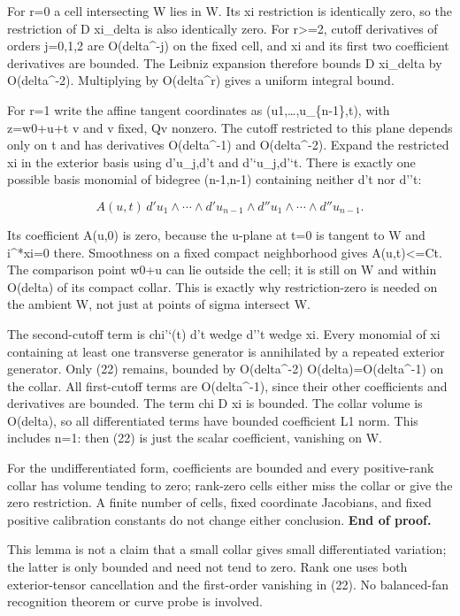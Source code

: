 \documentclass[
  10pt,
]{article}
\begin{document}
For r=0 a cell intersecting W lies in W. Its xi restriction is
identically zero, so the restriction of D xi\_delta is also identically
zero. For r\textgreater=2, cutoff derivatives of orders j=0,1,2 are
O(delta\^{}-j) on the fixed cell, and xi and its first two coefficient
derivatives are bounded. The Leibniz expansion therefore bounds D
xi\_delta by O(delta\^{}-2). Multiplying by O(delta\^{}r) gives a
uniform integral bound.

For r=1 write the affine tangent coordinates as
(u1,\ldots,u\_\{n-1\},t), with z=w0+u+t v and v fixed, Qv nonzero. The
cutoff restricted to this plane depends only on t and has derivatives
O(delta\^{}-1) and O(delta\^{}-2). Expand the restricted xi in the
exterior basis using d'u\_j,d't and d'`u\_j,d'`t. There is exactly one
possible basis monomial of bidegree (n-1,n-1) containing neither d't nor
d''t:

\[
 A(u,t)\,d'u_1\wedge\cdots\wedge d'u_{n-1}
          \wedge d''u_1\wedge\cdots\wedge d''u_{n-1}.         \tag{22}
\]

Its coefficient A(u,0) is zero, because the u-plane at t=0 is tangent to
W and i\^{}*xi=0 there. Smoothness on a fixed compact neighborhood gives
\textbar A(u,t)\textbar\textless=C\textbar t\textbar. The comparison
point w0+u can lie outside the cell; it is still on W and within
O(delta) of its compact collar. This is exactly why restriction-zero is
needed on the ambient W, not just at points of sigma intersect W.

The second-cutoff term is chi'`(t) d't wedge d''t wedge xi. Every
monomial of xi containing at least one transverse generator is
annihilated by a repeated exterior generator. Only (22) remains, bounded
by O(delta\^{}-2) O(delta)=O(delta\^{}-1) on the collar. All
first-cutoff terms are O(delta\^{}-1), since their other coefficients
and derivatives are bounded. The term chi D xi is bounded. The collar
volume is O(delta), so all differentiated terms have bounded coefficient
L1 norm. This includes n=1: then (22) is just the scalar coefficient,
vanishing on W.

For the undifferentiated form, coefficients are bounded and every
positive-rank collar has volume tending to zero; rank-zero cells either
miss the collar or give the zero restriction. A finite number of cells,
fixed coordinate Jacobians, and fixed positive calibration constants do
not change either conclusion. \textbf{End of proof.}

This lemma is not a claim that a small collar gives small differentiated
variation; the latter is only bounded and need not tend to zero. Rank
one uses both exterior-tensor cancellation and the first-order vanishing
in (22). No balanced-fan recognition theorem or curve probe is involved.
\end{document}
